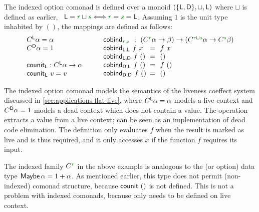 \begin{example}
The indexed option comonad is defined over a monoid $(\{ \textnormal{\sffamily L},\textnormal{\sffamily D} \}, \sqcup,\textnormal{\sffamily L})$ 
where $\sqcup$ is defined as earlier, \ie~$\ident{L} = \cclrd{r} \sqcup \cclrd{s} \Longleftrightarrow \cclrd{r}=\cclrd{s}=\ident{L}$.
Assuming $1$ is the unit type inhabited by $()$, the mappings are defined as follows:
%
\begin{equation*}
\begin{array}{l}
\ctyp{\ident{L}}{\alpha} = \alpha\\
\ctyp{\ident{D}}{\alpha} = 1\\
\\
\ident{counit}_{\ident{L}} : \ctyp{\ident{L}}{\alpha} \rightarrow \alpha \\
\ident{counit}_{\ident{L}}~v = v\\
\end{array}
\qquad
\begin{array}{lcl}
\multicolumn{3}{l}{
  \ident{cobind}_{\cclrd{r},\cclrd{s}} ~:~ (\ctyp{\cclrd{r}}{\alpha} \rightarrow \beta) 
    \rightarrow (\ctyp{\cclrd{r}\sqcup\cclrd{s}}{\alpha} \rightarrow \ctyp{\cclrd{s}}{\beta}) }\\
\ident{cobind}_{\ident{L},\ident{L}}~f~x &\narrow{=}& f~x\\
\ident{cobind}_{\ident{L},\ident{D}}~f~() &\narrow{=}& ()\\
\ident{cobind}_{\ident{D},\ident{L}}~f~() &\narrow{=}& f~()\\
\ident{cobind}_{\ident{D},\ident{D}}~f~() &\narrow{=}& ()\\
\end{array}
\end{equation*}
\end{example}

\noindent
The indexed option comonad models the semantics of the liveness coeffect system discussed in 
\ref{sec:applications-flat-live}, where $C^{\textnormal{\sffamily L}}\alpha = \alpha$ models a live context 
and $C^{\textnormal{\sffamily D}}\alpha=1$ models a dead context which does not contain a value. The 
operation extracts a value from a live context;  can be seen as an implementation of 
dead code elimination. The definition only evaluates $f$ when the result is marked as live and is thus
required, and it only accesses $x$ if the function $f$ requires its input.

The indexed family $\ctyp{\cclrd{r}}{}$ in the above example is analogous to the 
(or option) data type $\textnormal{\sffamily Maybe}\,\alpha = 1 + \alpha$. As mentioned earlier, this type does not 
permit (non-indexed) comonad structure, because $\textnormal{\sffamily counit}~()$ is not defined. This is not a 
problem with indexed comonads, because  only needs to be defined on live context.

